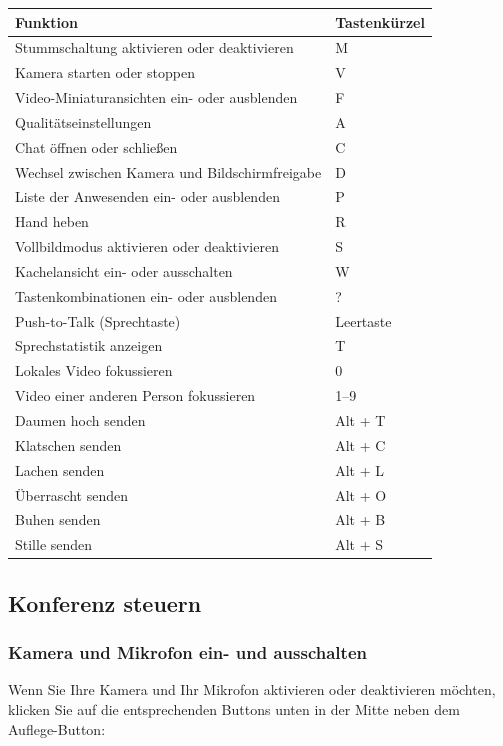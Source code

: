 \documentclass[
  letterpaper,
  DIV=11,
  numbers=noendperiod]{scrreprt}
\begin{document}
\begin{longtable}[]{@{}ll@{}}
\toprule\noalign{}
Funktion & Tastenkürzel \\
\midrule\noalign{}
\endhead
\bottomrule\noalign{}
\endlastfoot
Stummschaltung aktivieren oder deaktivieren & M \\
Kamera starten oder stoppen & V \\
Video-Miniaturansichten ein- oder ausblenden & F \\
Qualitätseinstellungen & A \\
Chat öffnen oder schließen & C \\
Wechsel zwischen Kamera und Bildschirmfreigabe & D \\
Liste der Anwesenden ein- oder ausblenden & P \\
Hand heben & R \\
Vollbildmodus aktivieren oder deaktivieren & S \\
Kachelansicht ein- oder ausschalten & W \\
Tastenkombinationen ein- oder ausblenden & ? \\
Push-to-Talk (Sprechtaste) & Leertaste \\
Sprechstatistik anzeigen & T \\
Lokales Video fokussieren & 0 \\
Video einer anderen Person fokussieren & 1--9 \\
Daumen hoch senden & Alt + T \\
Klatschen senden & Alt + C \\
Lachen senden & Alt + L \\
Überrascht senden & Alt + O \\
Buhen senden & Alt + B \\
Stille senden & Alt + S \\
\end{longtable}

\subsection{Konferenz steuern}\label{konferenz-steuern}

\subsubsection{Kamera und Mikrofon ein- und
ausschalten}\label{kamera-und-mikrofon-ein--und-ausschalten}

Wenn Sie Ihre Kamera und Ihr Mikrofon aktivieren oder deaktivieren
möchten, klicken Sie auf die entsprechenden Buttons unten in der Mitte
neben dem Auflege-Button:
\end{document}
